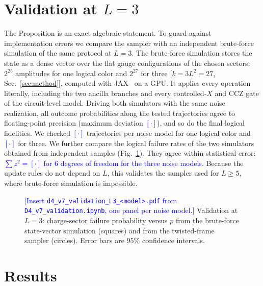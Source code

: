 \documentclass[a4paper]{article}
\newcommand{\blue}[1]{\textcolor{blue}{#1}}
\begin{document}
\section{Validation at \texorpdfstring{$L=3$}{L=3}}
\label{sec:validation}

The Proposition is an exact algebraic statement. To guard against implementation errors we compare the sampler with an independent brute-force simulation of the same protocol at $L=3$. The brute-force simulation stores the state as a dense vector over the flat gauge configurations of the chosen sectors: $2^{25}$ amplitudes for one logical color and $2^{27}$ for three [$k=3L^2=27$, Sec.~\ref{sec:method}], computed with JAX~\cite{jax2018github} on a GPU. It applies every operation literally, including the two ancilla branches and every controlled-$X$ and CCZ gate of the circuit-level model. Driving both simulators with the same noise realization, all outcome probabilities along the tested trajectories agree to floating-point precision (maximum deviation \blue{$[\cdot]$}), and so do the final logical fidelities. We checked \blue{$[\cdot]$} trajectories per noise model for one logical color and \blue{$[\cdot]$} for three. We further compare the logical failure rates of the two simulators obtained from independent samples (Fig.~\ref{fig:validation}). They agree within statistical error: \blue{$\sum z^2=[\cdot]$ for 6 degrees of freedom for the three noise models}. Because the update rules do not depend on $L$, this validates the sampler used for $L\geq5$, where brute-force simulation is impossible.

\begin{figure}[t]
  \centering
  \fbox{\rule{0pt}{50mm}\rule{0.82\linewidth}{0pt}}
  \caption{\blue{[Insert \texttt{d4\_v7\_validation\_L3\_<model>.pdf} from \texttt{D4\_v7\_validation.ipynb}, one panel per noise model.]} Validation at $L=3$: charge-sector failure probability versus $p$ from the brute-force state-vector simulation (squares) and from the twisted-frame sampler (circles). Error bars are $95\%$ confidence intervals.}
  \label{fig:validation}
\end{figure}

\section{Results}
\label{sec:results}
\end{document}
